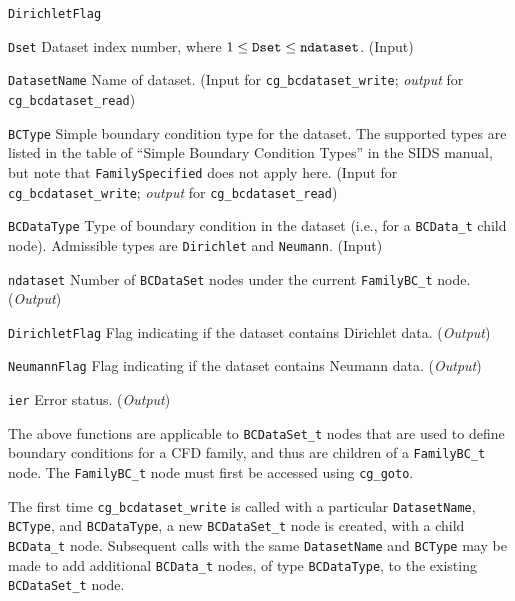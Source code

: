 \begin{Ventryi}{\texttt{DirichletFlag}}\raggedright
\item [\texttt{Dset}]
      Dataset index number, where $1 \leq \text{\texttt{Dset}} \leq \text{\texttt{ndataset}}$.
      (\textcolor{input}{Input})
\item [\texttt{DatasetName}]
      Name of dataset.
      (\textcolor{input}{Input} for \texttt{cg\_bcdataset\_write};
      \textcolor{output}{\textit{output}} for \texttt{cg\_bcdataset\_read})
\item [\texttt{BCType}]
      Simple boundary condition type for the dataset.
      The supported types are listed in the table of ``Simple
      Boundary Condition Types'' in the SIDS manual, but note that
      \texttt{FamilySpecified} does not apply here.
      (\textcolor{input}{Input} for \texttt{cg\_bcdataset\_write};
      \textcolor{output}{\textit{output}} for \texttt{cg\_bcdataset\_read})
\item [\texttt{BCDataType}]
      Type of boundary condition in the dataset (i.e., for a
      \texttt{BCData\_t} child node).
      Admissible types are \texttt{Dirichlet} and \texttt{Neumann}.
      (\textcolor{input}{Input})
\item [\texttt{ndataset}]
      Number of \texttt{BCDataSet} nodes under the current
      \texttt{FamilyBC\_t} node.
      (\textcolor{output}{\textit{Output}})
\item [\texttt{DirichletFlag}]
      Flag indicating if the dataset contains Dirichlet data.
      (\textcolor{output}{\textit{Output}})
\item [\texttt{NeumannFlag}]
      Flag indicating if the dataset contains Neumann data.
      (\textcolor{output}{\textit{Output}})
\item [\texttt{ier}]
      Error status.
      (\textcolor{output}{\textit{Output}})
\end{Ventryi}

The above functions are applicable to \texttt{BCDataSet\_t} nodes
that are used to define boundary conditions for a CFD family, and thus
are children of a \texttt{FamilyBC\_t} node.
The \texttt{FamilyBC\_t} node must first be accessed using \texttt{cg\_goto}.

The first time \texttt{cg\_bcdataset\_write} is called with a particular
\texttt{DatasetName}, \texttt{BCType}, and \texttt{BCDataType}, a new
\texttt{BCDataSet\_t} node is created, with a child \texttt{BCData\_t} node.
Subsequent calls with the same \texttt{DatasetName} and \texttt{BCType}
may be made to add additional \texttt{BCData\_t} nodes, of type
\texttt{BCDataType}, to the existing \texttt{BCDataSet\_t} node.

